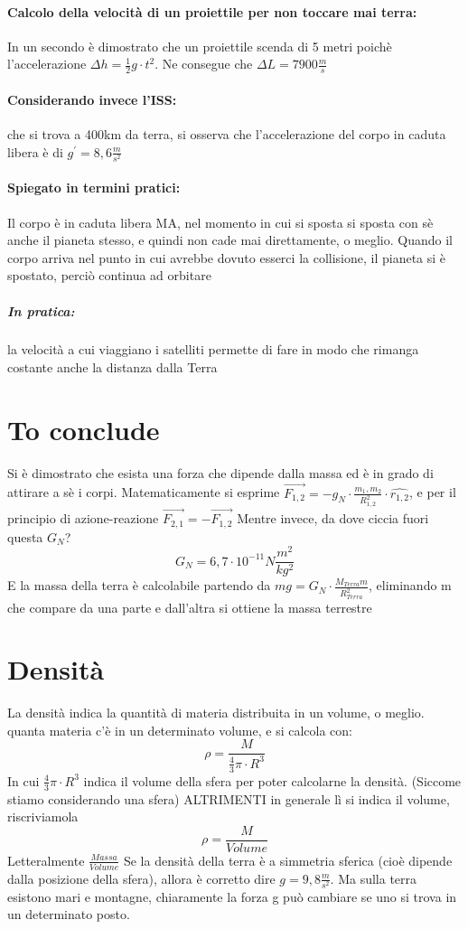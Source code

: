 \documentclass[12pt, a4paper, openany, oneside]{book}
\begin{document}
\paragraph{Calcolo della velocità di un proiettile per non toccare mai terra:}
In un secondo è dimostrato che un proiettile scenda di 5 metri poichè 
l'accelerazione $\Delta h = \frac{1}{2}g\cdot t^{2}$. Ne consegue che
$\Delta L = 7900 \frac{m}{s}$
\paragraph{Considerando invece l'ISS: } che si trova  a 400km da terra, si 
osserva che l'accelerazione del corpo in caduta libera è di $g^{'} = 8,6 
\frac{m}{s^{2}}$
\paragraph{Spiegato in termini pratici: } Il corpo è in caduta libera MA, nel 
momento in cui si sposta si sposta con sè anche il pianeta stesso, e quindi
non cade mai direttamente, o meglio. Quando il corpo arriva nel punto in cui 
avrebbe dovuto esserci la collisione, il pianeta si è spostato, perciò continua
ad orbitare
\subparagraph{In pratica: } la velocità a cui viaggiano i satelliti permette
di fare in modo che rimanga costante anche la distanza dalla Terra	
\section*{To conclude}
Si è dimostrato che esista una forza che dipende dalla massa ed è in grado
di attirare a sè i corpi. Matematicamente si esprime $\overrightarrow{F_{1,2}} 
= -g_{N}\cdot \frac{m_{1},m_{2}}{R_{1,2}^{2}} \cdot \widehat{r_{1,2}}$, e
per il principio di azione-reazione $\overrightarrow{F_{2,1}}= - 
\overrightarrow{F_{1,2}}$
Mentre invece, da dove ciccia fuori questa $G_{N}$? 
\[
G_{N} = 6,7 \cdot 10^{-11} N \frac{m^{2}}{kg^{2}}
\]	
E la massa della terra è calcolabile partendo da $mg =
G_{N}\cdot \frac{M_{Terra}m}{R^{2}_{Terra}}$, eliminando m che compare da una 
parte e dall'altra si ottiene la massa terrestre
\section{Densità}
La densità indica la quantità di materia distribuita in un volume, o meglio.
quanta materia c'è in un determinato volume, e si calcola con:
\[
\rho = \frac{M}{\frac{4}{3}\pi \cdot R^{3}}
\]	
In cui $\frac{4}{3}\pi\cdot R^{3}$ indica il volume della sfera per poter calcolarne la
densità. (Siccome stiamo considerando una sfera) ALTRIMENTI in generale lì 
si indica il volume, riscriviamola
\[
\rho = \frac{M}{Volume}
\]	
Letteralmente $\frac{Massa}{Volume}$
Se la densità della terra è a simmetria sferica (cioè dipende dalla posizione
della sfera), allora è corretto dire $g = 9,8 \frac{m}{s^{2}}$. Ma sulla terra
esistono mari e montagne, chiaramente la forza g può cambiare se uno si trova
in un determinato posto.
\end{document}
